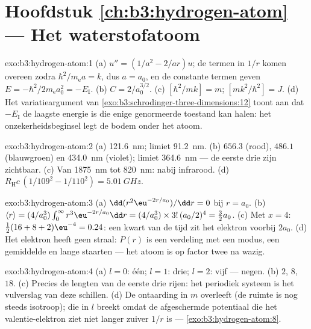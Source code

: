 \section*{Hoofdstuk \ref{ch:b3:hydrogen-atom} --- Het waterstofatoom}

\begin{solution}{exo:b3:hydrogen-atom:1}
(a) $u'' = (1/a^2 - 2/ar)u$; de termen in $1/r$ komen overeen zodra
$\hbar^2/m_{\text{e}}a = k$, dus $a = a_0$, en de constante termen geven
$E = -\hbar^2/2m_{\text{e}}a_0^2 = -E_{\text{I}}$. (b) $C =
2/a_0^{3/2}$. (c) $[\hbar^2/mk] = \unit{m}$; $[mk^2/\hbar^2] =
\unit{J}$. (d) Het variatieargument van
\cref{exo:b3:schrodinger-three-dimensions:12} toont aan dat
$-E_{\text{I}}$ de laagste energie is die enige genormeerde toestand kan
halen: het onzekerheidsbeginsel legt de bodem onder het atoom.
\end{solution}

\begin{solution}{exo:b3:hydrogen-atom:2}
(a) \qty{121.6}{nm}; limiet \qty{91.2}{nm}. (b) $656.3$ (rood),
$486.1$ (blauwgroen) en \qty{434.0}{nm} (violet); limiet
\qty{364.6}{nm} --- de eerste drie zijn zichtbaar. (c) Van
\qty{1875}{nm} tot \qty{820}{nm}: nabij infrarood. (d)
$R_{\text{H}}c\,(1/109^2 - 1/110^2) = \qty{5.01}{GHz}$.
\end{solution}

\begin{solution}{exo:b3:hydrogen-atom:3}
(a) $\dd(r^2\eu^{-2r/a_0})/\dd r = 0$ bij $r = a_0$. (b) $\langle r\rangle = (4/a_0^3)\int_0^\infty
r^3\eu^{-2r/a_0}\dd r = (4/a_0^3)\times 3!\,(a_0/2)^4 = \tfrac32
a_0$. (c) Met $x = 4$: $\tfrac12(16 + 8 + 2)\eu^{-4} = 0.24$: een kwart
van de tijd zit het elektron voorbij $2a_0$. (d) Het elektron heeft geen
straal: $P(r)$ is een verdeling met een modus, een gemiddelde en lange
staarten --- het atoom is op factor twee na wazig.
\end{solution}

\begin{solution}{exo:b3:hydrogen-atom:4}
(a) $l = 0$: één; $l = 1$: drie; $l = 2$: vijf --- negen. (b) $2$,
$8$, $18$. (c) Precies de lengten van de eerste drie rijen: het periodiek
systeem is het vulverslag van deze schillen. (d) De ontaarding in $m$
overleeft (de ruimte is nog steeds isotroop); die in $l$ breekt omdat de
afgeschermde potentiaal die het valentie-elektron ziet niet langer zuiver
$1/r$ is --- \cref{exo:b3:hydrogen-atom:8}.
\end{solution}

